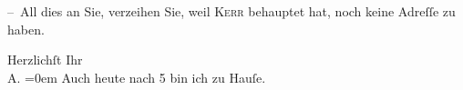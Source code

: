 \pstart
           – All dies an Sie, verzeihen Sie, weil \textsc{Kerr} behauptet hat, noch keine Adreſſe zu haben.\pend
           
\pstart
           Herzlichſt Ihr{\\[\baselineskip]}\spacefill\mbox{A.}\pend
           \leftskip=0em{}
\pstart
           \noindent{}Auch heute nach 5 bin ich zu Hauſe.\pend
           \endnumbering{}  \newcommand{\dateiname}{L01811}\newcommand{\titel}{Arthur Schnitzler an Richard Beer-Hofmann, 28. 11. 1908}\newcommand{\editorInnen}{Martin Anton Müller und Gerd-Hermann Susen}
